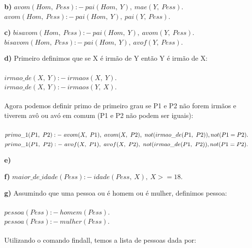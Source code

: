 \documentclass[12pt]{article}
\begin{document}
\begin{itemize}
\begin{itemize}
				\item[\textbf{b) }]
					\hfill\newline
					$avom(Hom, \ Pess) :- \ pai(Hom,\  Y), \ mae(Y, \ Pess).$\\
					$avom(Hom, \ Pess) :- \ pai(Hom, \ Y), \ pai(Y, \ Pess).$\\
				\item[\textbf{c) }]
					\hfill\newline
					$bisavom(Hom, \ Pess) :- \ pai(Hom, \ Y), \ avom(Y, \ Pess).$\\
					$bisavom(Hom, \ Pess) :- \ pai(Hom, \ Y), \ avof(Y, \ Pess).$\\
				\item[\textbf{d) }]
					\hfill\newline
					Primeiro definimos que se X é irmão de Y então Y é irmão de X:\\	 \\				
					$irmao\_de(X, \ Y) :- \ irmaos(X, \ Y).$\\
					$irmao\_de(X, \ Y) :- \ irmaos(Y, \ X).$\\ \\
					Agora podemos definir primo de primeiro grau se P1 e P2 não forem irmãos e
					tiverem avô ou avó em comum (P1 e P2 não podem ser iguais):\\ \\
					$primo\_1(P1, \ P2) :- \ avom(X, \ P1), \ avom(X, \ P2), \ not(irmao\_de(P1, \ P2)), \\
					not(P1 = P2).$\\
					$primo\_1(P1, \ P2) :- \ avof(X, \ P1), \ avof(X, \ P2), \ not(irmao\_de(P1, \ P2)), \\
					not(P1 = P2).$\\
				\item[\textbf{e) }]
				\item[\textbf{f) }]
					\hfill\newline
					$maior\_de\_idade(Pess) :- \ idade(Pess, \ X), \ X >= 18.$\\
				\item[\textbf{g) }]
					\hfill\newline
					Assumindo que uma pessoa ou é homem ou é mulher, definimos pessoa:\\ \\
					$pessoa(Pess) :- \ homem(Pess).$\\
					$pessoa(Pess) :- \ mulher(Pess).$\\ \\
					Utilizando o comando findall, temos a lista de pessoas dada por:\\ \\

\end{itemize}
\end{itemize}
\end{document}
